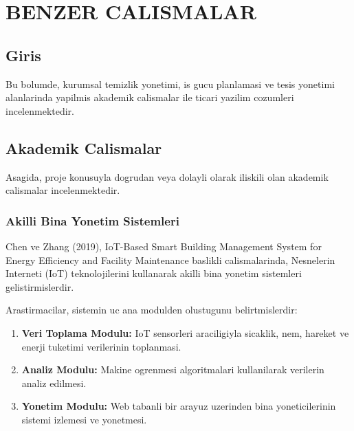 
\chapter{BENZER CALISMALAR}
\label{chap:benzer-calismalar}

\section{Giris}
\label{sec:literatur-giris}

Bu bolumde, kurumsal temizlik yonetimi, is gucu planlamasi ve tesis 
yonetimi alanlarinda yapilmis akademik calismalar ile ticari yazilim 
cozumleri incelenmektedir.

\section{Akademik Calismalar}
\label{sec:akademik-calismalar}

Asagida, proje konusuyla dogrudan veya dolayli olarak iliskili olan 
akademik calismalar incelenmektedir.

\subsection{Akilli Bina Yonetim Sistemleri}
\label{subsec:akilli-bina}

Chen ve Zhang (2019), IoT-Based Smart Building Management System for 
Energy Efficiency and Facility Maintenance baslikli calismalarinda, 
Nesnelerin Interneti (IoT) teknolojilerini kullanarak akilli bina 
yonetim sistemleri gelistirmislerdir.

Arastirmacilar, sistemin uc ana modulden olustugunu belirtmislerdir:
\begin{enumerate}
    \item \textbf{Veri Toplama Modulu:} IoT sensorleri araciligiyla 
    sicaklik, nem, hareket ve enerji tuketimi verilerinin toplanmasi.
    \item \textbf{Analiz Modulu:} Makine ogrenmesi algoritmalari 
    kullanilarak verilerin analiz edilmesi.
    \item \textbf{Yonetim Modulu:} Web tabanli bir arayuz uzerinden 
    bina yoneticilerinin sistemi izlemesi ve yonetmesi.
\end{enumerate}


